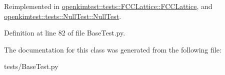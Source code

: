 Reimplemented in \hyperlink{classopenkimtest_1_1tests_1_1FCCLattice_1_1FCCLattice_a69fb263d9d74811896d5cd50f9b3f0f1}{openkimtest::tests::FCCLattice::FCCLattice}, and \hyperlink{classopenkimtest_1_1tests_1_1NullTest_1_1NullTest_a7a7fc0a6bbd33b627c515a53649f477f}{openkimtest::tests::NullTest::NullTest}.



Definition at line 82 of file BaseTest.py.



The documentation for this class was generated from the following file:\begin{DoxyCompactItemize}
\item 
tests/BaseTest.py\end{DoxyCompactItemize}
